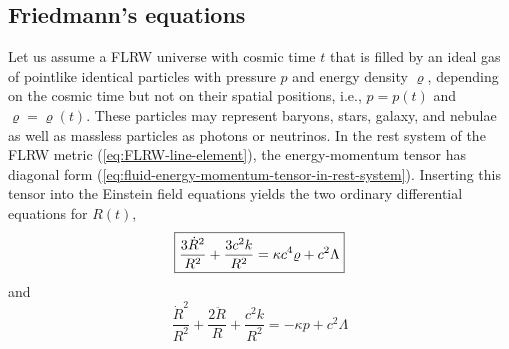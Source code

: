 \subsection{Friedmann's equations}
Let us assume a FLRW universe with  cosmic time $t$ that is filled by an ideal gas of pointlike identical particles with pressure $p$ and energy density $\varrho$, depending on the cosmic time but not on their spatial positions, i.e., $p = p(t)$ and $\varrho = \varrho(t)$.
These particles may represent baryons, stars, galaxy, and nebulae as well as massless particles as photons or neutrinos.
In the rest system of the FLRW metric (\ref{eq:FLRW-line-element}), the energy-momentum tensor has diagonal form (\ref{eq:fluid-energy-momentum-tensor-in-rest-system}).
Inserting this tensor into the Einstein field equations yields the two ordinary differential equations for $R(t)$,
\begin{equation}
	\fbox{$\displaystyle
	\frac{3 \dot{R}^2}{R^2} + \frac{3 c^2 k}{R^2} = 
	\kappa c^4 \varrho + c^2 \Lambda
	$}
	\label{eq:FLRW-dynamics-2}
\end{equation} 
and
\begin{equation}
	\frac{\dot{R}^2}{R^2} + \frac{2 \ddot{R}}{R} + \frac{c^2 k}{R^2} 
	= 
	- \kappa p + c^2 \Lambda
	\label{eq:FLRW-dynamics-1}
\end{equation}
